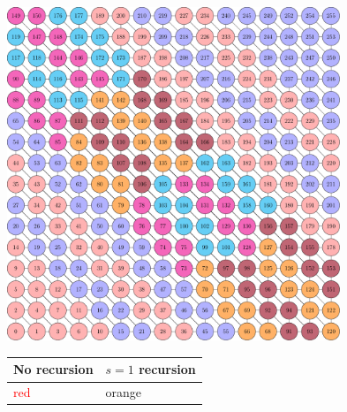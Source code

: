        \begin{figure}[H]
       	\begin{minipage}[c]{0.6\textwidth}
       		\includegraphics[height=0.3\textheight,width=0.89\textwidth]{pics/recursion/2d-7pt_example/2d-7pt/stencil_2d_7pt}
       	\end{minipage}\hfill
       	\begin{minipage}[c]{0.4\textwidth}
	       	\begin{tabular}{l|l}
	       		{No recursion} & {$s=1$ recursion}\\
	       		\midrule
	       	   \multirow{2}{*}{\textcolor{red}{red}} & {\textcolor{amber}{orange}}\\

\end{tabular}
\end{minipage}
\end{figure}
